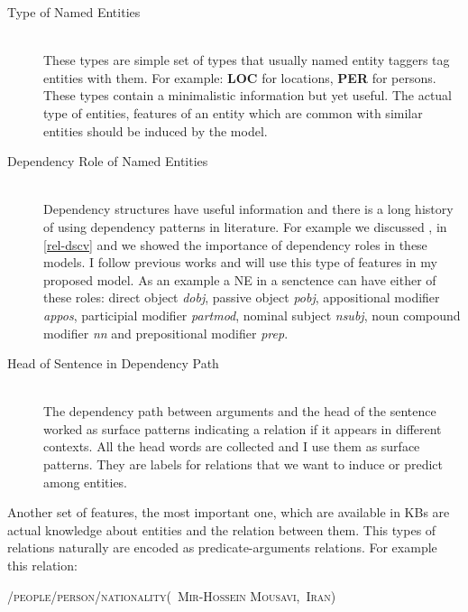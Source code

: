 \begin{description}
  
  \item[Type of Named Entities] \hfill \\
    These types are simple set of types that usually named entity taggers tag
    entities with them. For example: \textbf{LOC} for locations, \textbf{PER}
    for persons. These types contain a minimalistic information but yet useful.
    The actual type of entities, features of an entity which are common with
    similar entities should be induced by the model.
    
  \item[Dependency Role of Named Entities] \hfill \\
    Dependency structures have useful information and there is a long history of
    using dependency patterns in literature. For example we discussed
    \cite{Dirt}, \cite{patty} in \ref{rel-dscv} and we showed the importance of
    dependency roles in these models. I follow previous works and will use this
    type of features in my proposed model. As an example a NE in a senctence can
    have either of these roles: direct object \textit{dobj}, passive object
    \textit{pobj}, appositional modifier \textit{appos}, participial modifier
    \textit{partmod}, nominal subject \textit{nsubj}, noun compound modifier
    \textit{nn} and prepositional modifier \textit{prep}.
 
  \item[Head of Sentence in Dependency Path] \hfill \\
  
  The dependency path between arguments and the head of the sentence worked as
  surface patterns indicating a relation if it appears in different contexts.
  All the head words are collected and I use them as surface patterns. They are
 labels for relations that we want to induce or predict among entities. 
  
  
 \end{description}
 
 Another set of features, the most important one, which are available in KBs are
 actual knowledge about entities and the relation between them. This types of
 relations naturally are encoded as predicate-arguments relations. For example
 this relation:
\begin{center}
\label{rel:mir}
\textsc{ /people/person/nationality(~Mir-Hossein Mousavi,~Iran)}
\hfill
\end{center}


